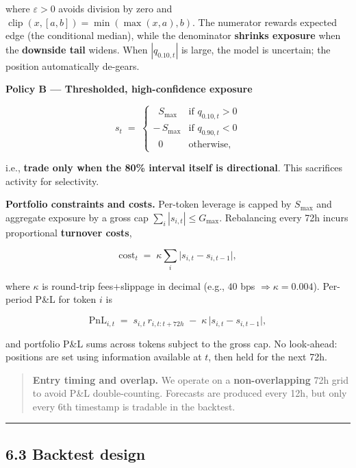 \documentclass[
  a4paper,
  DIV=11,
  numbers=noendperiod]{scrreprt}
\begin{document}
where \(\varepsilon>0\) avoids division by zero and
\(\operatorname{clip}(x,[a,b])=\min(\max(x,a),b)\). The numerator
rewards expected edge (the conditional median), while the denominator
\textbf{shrinks exposure} when the \textbf{downside tail} widens. When
\(|q_{0.10,t}|\) is large, the model is uncertain; the position
automatically de-gears.

\textbf{Policy B --- Thresholded, high-confidence exposure}

\[
s_t \;=\;
\begin{cases}
\;\;S_{\max} & \text{if } q_{0.10,t}>0 \\
-\,S_{\max}  & \text{if } q_{0.90,t}<0 \\
\;\;0        & \text{otherwise,}
\end{cases}
\]

i.e., \textbf{trade only when the 80\% interval itself is directional}.
This sacrifices activity for selectivity.

\textbf{Portfolio constraints and costs.} Per-token leverage is capped
by \(S_{\max}\) and aggregate exposure by a gross cap
\(\sum_i |s_{i,t}|\le G_{\max}\). Rebalancing every 72h incurs
proportional \textbf{turnover costs},

\[
\text{cost}_t \;=\; \kappa \sum_i \big|s_{i,t}-s_{i,t-1}\big|,
\]

where \(\kappa\) is round-trip fees+slippage in decimal (e.g., \(40\)
bps \(\Rightarrow \kappa=0.004\)). Per-period P\&L for token \(i\) is

\[
\text{PnL}_{i,t} \;=\; s_{i,t}\,r_{i,t:t+72h} \;-\; \kappa\,\big|s_{i,t}-s_{i,t-1}\big|,
\]

and portfolio P\&L sums across tokens subject to the gross cap. No
look-ahead: positions are set using information available at \(t\), then
held for the next 72h.

\begin{quote}
\textbf{Entry timing and overlap.} We operate on a
\textbf{non-overlapping} 72h grid to avoid P\&L double-counting.
Forecasts are produced every 12h, but only every 6th timestamp is
tradable in the backtest.
\end{quote}

\begin{center}\rule{0.5\linewidth}{0.5pt}\end{center}

\subsection{6.3 Backtest design}\label{backtest-design}
\end{document}

